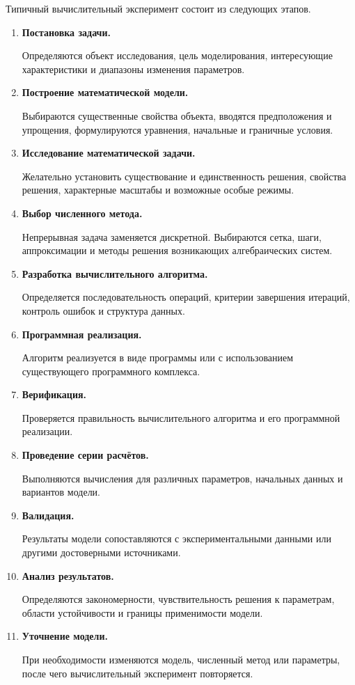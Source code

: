 Типичный вычислительный эксперимент состоит из следующих этапов.

\begin{enumerate}
	\item \textbf{Постановка задачи.}
	
	Определяются объект исследования, цель моделирования, интересующие характеристики и диапазоны изменения параметров.
	
	\item \textbf{Построение математической модели.}
	
	Выбираются существенные свойства объекта, вводятся предположения и упрощения, формулируются уравнения, начальные и граничные условия.
	
	\item \textbf{Исследование математической задачи.}
	
	Желательно установить существование и единственность решения, свойства решения, характерные масштабы и возможные особые режимы.
	
	\item \textbf{Выбор численного метода.}
	
	Непрерывная задача заменяется дискретной. Выбираются сетка, шаги, аппроксимации и методы решения возникающих алгебраических систем.
	
	\item \textbf{Разработка вычислительного алгоритма.}
	
	Определяется последовательность операций, критерии завершения итераций, контроль ошибок и структура данных.
	
	\item \textbf{Программная реализация.}
	
	Алгоритм реализуется в виде программы или с использованием существующего программного комплекса.
	
	\item \textbf{Верификация.}
	
	Проверяется правильность вычислительного алгоритма и его программной реализации.
	
	\item \textbf{Проведение серии расчётов.}
	
	Выполняются вычисления для различных параметров, начальных данных и вариантов модели.
	
	\item \textbf{Валидация.}
	
	Результаты модели сопоставляются с экспериментальными данными или другими достоверными источниками.
	
	\item \textbf{Анализ результатов.}
	
	Определяются закономерности, чувствительность решения к параметрам, области устойчивости и границы применимости модели.
	
	\item \textbf{Уточнение модели.}
	
	При необходимости изменяются модель, численный метод или параметры, после чего вычислительный эксперимент повторяется.
\end{enumerate}


